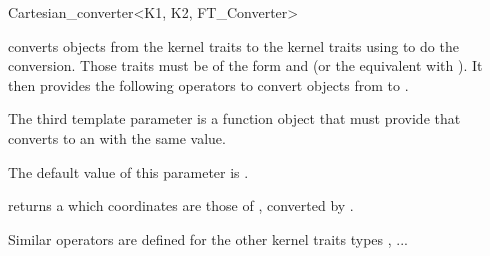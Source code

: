 \begin{ccRefClass}{Cartesian_converter<K1, K2, FT_Converter>}

\KernelRefLayout\gdef\ccTagOperatorLayout{\ccFalse}

\ccDefinition

\ccClassTemplateName converts objects from the kernel traits  to
the kernel traits  using  to do the conversion.  
Those traits must be of the form
 and  (or the equivalent with
).  It then provides the following operators to convert
objects from  to .

The third template parameter  is a function object that must
provide  that
converts  to an  with the same value.

The default value of this parameter is .


\ccCreation
{}


\ccOperations

{ returns a  which coordinates are those of ,
converted by .}

Similar operators are defined for the other kernel traits types ,
...

\ccSeeAlso
{} \\
 \\
\end{ccRefClass}

